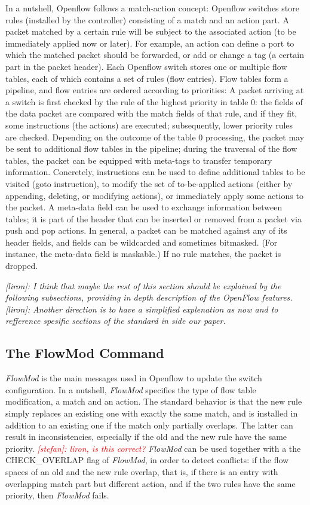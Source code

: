 \documentclass[conference]{sigcomm-alternate}
\newcommand{\stefan}[1]{\textit{\textcolor{red}{[stefan]: #1}}} %
\newcommand{\liron}[1]{\textit{\textcolor{mygreen}{[liron]: #1}}} %
\begin{document}
In a nutshell,
Openflow
follows a match-action concept: Openflow switches store
rules (installed by the controller) consisting of a match and an
action part. A packet matched by a certain rule will be subject
to the associated action (to be immediately applied now or later).
For example, an action can define a port to which the
matched packet should be forwarded, or add or change a tag
(a certain part in the packet header).
Each Openflow switch stores one or multiple flow tables,
each of which contains a set of rules (flow entries). Flow
tables form a pipeline, and flow entries are ordered according
to priorities: A packet arriving at a switch is first checked by
the rule of the highest priority in table 0: the fields of the
data packet are compared with the match fields of that rule,
and if they fit, some instructions (the actions) are executed;
subsequently, lower priority rules are checked. Depending on
the outcome of the table 0 processing, the packet may be sent
to additional flow tables in the pipeline; during the traversal of
the flow tables, the packet can be equipped with meta-tags to
transfer temporary information. Concretely, instructions can be
used to define additional tables to be visited (goto instruction),
to modify the set of to-be-applied actions (either by appending,
deleting, or modifying actions), or immediately apply some
actions to the packet. A meta-data field can be used to exchange
information between tables; it is part of the header that can be
inserted or removed from a packet via push and pop actions.
In general, a packet can be matched against any of its header
fields, and fields can be wildcarded and sometimes bitmasked.
(For instance, the meta-data field is maskable.) If no rule
matches, the packet is dropped.

\liron{I think that maybe the rest of this section should be explained by the following subsections, providing in depth description of the OpenFlow features.}
\liron{Another direction is to have a simplified explenation as now and to refference spesific sections of the standard in side our paper.}

\subsection{The FlowMod Command}

\emph{FlowMod} is the main messages used in Openflow 
to update the switch configuration. 
In a nutshell, \emph{FlowMod} specifies the type of flow table modification,
a match and an action. 
The standard behavior is that the new rule simply replaces an existing one
with exactly the same match, and is installed
in addition to an existing one if the match only
partially overlaps. The latter can result
in inconsistencies, especially if the old and the new rule
have the same priority. \stefan{liron, is this correct?}
\emph{FlowMod} can be used together with a the CHECK\_OVERLAP flag
of \emph{FlowMod}, in order to detect conflicts: if the flow spaces of an old
and the new rule overlap, 
that is, if there is an entry with overlapping match part but different action, 
 and if the two rules have the same priority, then 
\emph{FlowMod} fails. 
\end{document}
